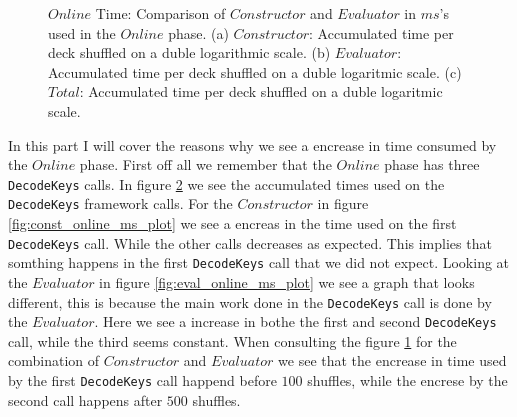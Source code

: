 \documentclass[twoside,11pt,openright]{report}
\begin{document}
\begin{figure}
    \begin{subfigure}{\textwidth}
        \centering
        \caption{}
        \label{fig:total_online_ms_plot}
    \end{subfigure}

    \caption{$Online$ Time: Comparison of $Constructor$ and $Evaluator$ in $ms$'s used in the $Online$ phase. (a) $Constructor$: Accumulated time per deck shuffled on a duble logarithmic scale. (b) $Evaluator$: Accumulated time per deck shuffled on a duble logaritmic scale. (c) $Total$: Accumulated time per deck shuffled on a duble logaritmic scale.}
    \label{fig:mesurement_online_ms}
\end{figure}

In this part I will cover the reasons why we see a encrease in time consumed by the $Online$ phase. First off all we remember that the $Online$ phase has three \verb|DecodeKeys| calls. In figure \ref{fig:mesurement_online_ms} we see the accumulated times used on the \verb|DecodeKeys| framework calls. For the $Constructor$ in figure \ref{fig:const_online_ms_plot} we see a encreas in the time used on the first \verb|DecodeKeys| call. While the other calls decreases as expected. This implies that somthing happens in the first \verb|DecodeKeys| call that we did not expect. 
Looking at the $Evaluator$ in figure \ref{fig:eval_online_ms_plot} we see a graph that looks different, this is because the main work done in the \verb|DecodeKeys| call is done by the $Evaluator$. Here we see a increase in bothe the first and second \verb|DecodeKeys| call, while the third seems constant. 
When consulting the figure \ref{fig:total_online_ms_plot} for the combination of $Constructor$ and $Evaluator$ we see that the encrease in time used by the first \verb|DecodeKeys| call happend before $100$ shuffles, while the encrese by the second call happens after $500$ shuffles. 
\end{document}
